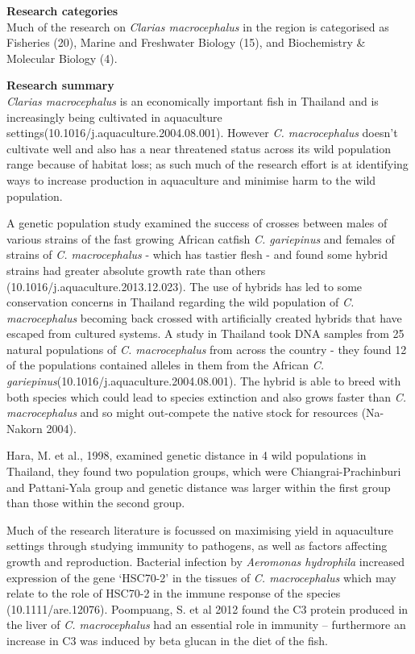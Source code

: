 \documentclass[]{book}
\theoremstyle{definition}
\theoremstyle{definition}
\theoremstyle{definition}
\theoremstyle{remark}
\begin{document}
\textbf{Research categories}\\
Much of the research on \emph{Clarias macrocephalus} in the region is
categorised as Fisheries (20), Marine and Freshwater Biology (15), and
Biochemistry \& Molecular Biology (4).

\textbf{Research summary}\\
\emph{Clarias macrocephalus} is an economically important fish in
Thailand and is increasingly being cultivated in aquaculture
settings(10.1016/j.aquaculture.2004.08.001). However \emph{C.
macrocephalus} doesn't cultivate well and also has a near threatened
status across its wild population range because of habitat loss; as such
much of the research effort is at identifying ways to increase
production in aquaculture and minimise harm to the wild population.

A genetic population study examined the success of crosses between males
of various strains of the fast growing African catfish \emph{C.
gariepinus} and females of strains of \emph{C. macrocephalus} - which
has tastier flesh - and found some hybrid strains had greater absolute
growth rate than others (10.1016/j.aquaculture.2013.12.023). The use of
hybrids has led to some conservation concerns in Thailand regarding the
wild population of \emph{C. macrocephalus} becoming back crossed with
artificially created hybrids that have escaped from cultured systems. A
study in Thailand took DNA samples from 25 natural populations of
\emph{C. macrocephalus} from across the country - they found 12 of the
populations contained alleles in them from the African \emph{C.
gariepinus}(10.1016/j.aquaculture.2004.08.001). The hybrid is able to
breed with both species which could lead to species extinction and also
grows faster than \emph{C. macrocephalus} and so might out-compete the
native stock for resources (Na-Nakorn 2004).

Hara, M. et al., 1998, examined genetic distance in 4 wild populations
in Thailand, they found two population groups, which were
Chiangrai-Prachinburi and Pattani-Yala group and genetic distance was
larger within the first group than those within the second group.

Much of the research literature is focussed on maximising yield in
aquaculture settings through studying immunity to pathogens, as well as
factors affecting growth and reproduction. Bacterial infection by
\emph{Aeromonas hydrophila} increased expression of the gene `HSC70-2'
in the tissues of \emph{C. macrocephalus} which may relate to the role
of HSC70-2 in the immune response of the species (10.1111/are.12076).
Poompuang, S. et al 2012 found the C3 protein produced in the liver of
\emph{C. macrocephalus} had an essential role in immunity -- furthermore
an increase in C3 was induced by beta glucan in the diet of the fish.
\end{document}
